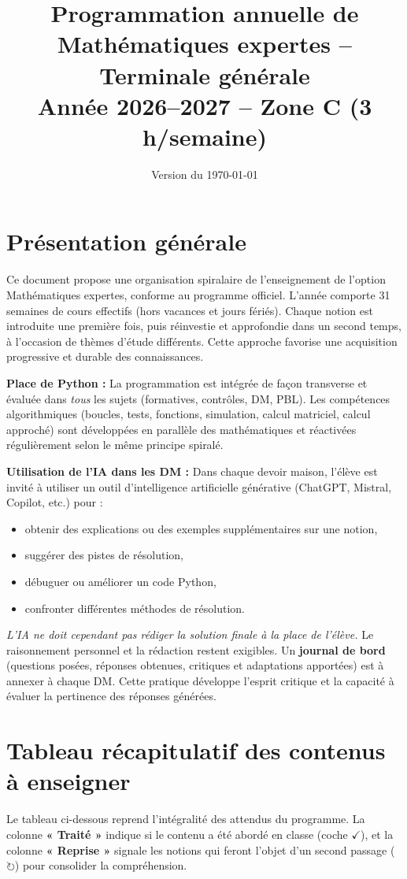 \documentclass[a4paper,12pt]{article}
\title{Programmation annuelle de Mathématiques expertes -- Terminale générale \\
	Année 2026--2027 -- Zone C (3 h/semaine)}
\author{}
\date{Version du \today}
\newcommand{\fait}{\ensuremath{\checkmark}}
\newcommand{\revoit}{\ensuremath{\circlearrowright}}
\begin{document}
	
	\maketitle
	
	\section*{Présentation générale}
	Ce document propose une organisation spiralaire de l’enseignement de l’option Mathématiques expertes, conforme au programme officiel. L’année comporte 31 semaines de cours effectifs (hors vacances et jours fériés). Chaque notion est introduite une première fois, puis réinvestie et approfondie dans un second temps, à l’occasion de thèmes d’étude différents. Cette approche favorise une acquisition progressive et durable des connaissances.
	
	\medskip
	\textbf{Place de Python :} La programmation est intégrée de façon transverse et évaluée dans \emph{tous} les sujets (formatives, contrôles, DM, PBL). Les compétences algorithmiques (boucles, tests, fonctions, simulation, calcul matriciel, calcul approché) sont développées en parallèle des mathématiques et réactivées régulièrement selon le même principe spiralé.
	
	\medskip
	\textbf{Utilisation de l’IA dans les DM :} Dans chaque devoir maison, l’élève est invité à utiliser un outil d’intelligence artificielle générative (ChatGPT, Mistral, Copilot, etc.) pour :
	\begin{itemize}
		\item obtenir des explications ou des exemples supplémentaires sur une notion,
		\item suggérer des pistes de résolution,
		\item débuguer ou améliorer un code Python,
		\item confronter différentes méthodes de résolution.
	\end{itemize}
	\emph{L’IA ne doit cependant pas rédiger la solution finale à la place de l’élève.} Le raisonnement personnel et la rédaction restent exigibles. Un \textbf{journal de bord} (questions posées, réponses obtenues, critiques et adaptations apportées) est à annexer à chaque DM. Cette pratique développe l’esprit critique et la capacité à évaluer la pertinence des réponses générées.
	
	\newpage
	
	\section{Tableau récapitulatif des contenus à enseigner}
	Le tableau ci-dessous reprend l’intégralité des attendus du programme. La colonne \textbf{« Traité »} indique si le contenu a été abordé en classe (coche \fait), et la colonne \textbf{« Reprise »} signale les notions qui feront l’objet d’un second passage (\revoit) pour consolider la compréhension.
	
\end{document}
